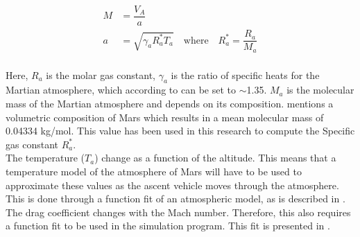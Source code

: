  \begin{equation} \label{eq:machAndSpeedOfSound}
\begin{split}
M &= \dfrac{V_{A}}{a} \\
a &= \sqrt{\gamma_{a}R_{a}^{*}T_{a}} \quad \text{where} \quad R_{a}^{*}=\dfrac{R_{a}}{M_{a}} \\
\end{split}
\end{equation}






\noindent
Here, $R_{a}$ is the molar gas constant, $\gamma_{a}$ is the ratio of specific heats for the Martian atmosphere, which according to \cite{ho2002radio} can be set to $\sim$1.35. $M_{a}$ is the molecular mass of the Martian atmosphere and depends on its composition. \cite{williams2015} mentions a volumetric composition of Mars which results in a mean molecular mass of 0.04334 kg/mol. This value has been used in this research to compute the Specific gas constant $R_{a}^{*}$.\\

\noindent
The temperature ($T_{{a}}$) change as a function of the altitude. This means that a temperature model of the atmosphere of Mars will have to be used to approximate these values as the ascent vehicle moves through the atmosphere. This is done through a function fit of an atmospheric model, as is described in .\\

\noindent
The drag coefficient changes with the Mach number. Therefore, this also requires a function fit to be used in the simulation program. This fit is presented in .

